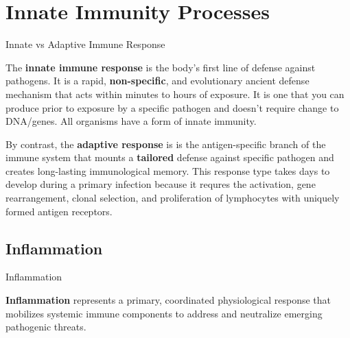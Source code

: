 \section{Innate Immunity Processes}

  \begin{core}{Innate vs Adaptive Immune Response}

    The \textbf{innate immune response} is the body's first line of defense against pathogens. It is a rapid, \textbf{non-specific}, and evolutionary ancient defense mechanism that acts within minutes to hours of exposure. It is one that you can produce prior to exposure by a specific pathogen and doesn't require change to DNA/genes. All organisms have a form of innate immunity.

    By contrast, the \textbf{adaptive response} is is the antigen-specific branch of the immune system that mounts a \textbf{tailored} defense against specific pathogen and creates long-lasting immunological memory. This response type takes days to develop during a primary infection because it requres the activation, gene rearrangement, clonal selection, and proliferation of lymphocytes with uniquely formed antigen receptors.

  \end{core}

  \subsection{Inflammation}

    \begin{core}{Inflammation}

      \textbf{Inflammation} represents a primary, coordinated physiological response that mobilizes systemic immune components to address and neutralize emerging pathogenic threats.

    \end{core}

